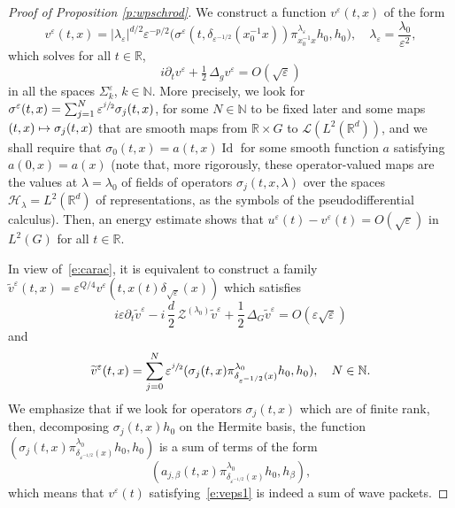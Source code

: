 \documentclass[JEP,XML,SOM,Unicode,published]{cedram}
\let\mathcal\mathscr
\newcommand\mto{\mathchoice{\longmapsto}{\mapsto}{\mapsto}{\mapsto}}
\DeclareMathOperator{\Id}{Id}
\theoremstyle{plain}
\theoremstyle{definition}
\let\eps\varepsilon
\def\R{{\mathbb R}}
\def\N{{\mathbb N}}
\begin{document}
\begin{proof}[Proof of Proposition \ref{p:wpschrod}]
We construct a function $v^\eps(t,x)$
of the form
\begin{equation} \label{e:veps1}
v^\eps(t,x)= |\lambda_\eps|^{d/2} \eps^{-p/2} \bigl(\sigma^\eps(t,\delta_{\eps^{-1/2}}(x_0^{-1} x)) \pi^{\lambda_\eps}_{x_0^{-1} x} h_0,h_0\bigr),\quad \lambda_\eps=\frac{\lambda_0}{\eps^2},
\end{equation}
which
solves for all $t\in\R$,
\begin{equation*}%
i\partial_t v^\eps +\tfrac 12\, \Delta_g v^\eps= O(\sqrt\eps)
\end{equation*}
in all the spaces $\Sigma^\eps_k$, $k\in\N$.
More precisely, we look for $\sigma^\eps(t,x) =\sum_{j=1}^N\eps^{\sfrac{j}{2}}\sigma_j(t,x)$, for some $N\in\N$ to be fixed later and
some maps $(t,x)\mto \sigma_j(t,x) $ that are smooth maps from $\R\times G$ to $\mathcal L(L^2(\R^d))$, and we shall require that $\sigma_0(t,x)=a(t,x)\Id$ for some smooth function $a$ satisfying $a(0,x)=a(x)$
(note that, more rigorously, these operator-valued maps are the values at $\lambda=\lambda_0$ of fields of operators $\sigma_j(t,x,\lambda)$ over the spaces $\mathcal H_\lambda = L^2(\R^d)$ of representations, as the symbols of the pseudodifferential calculus).
Then, an energy estimate shows that $u^\eps(t)-v^\eps(t) =O(\sqrt\eps)$ in $L^2(G)$ for all $t\in \R$.

In view of~\eqref{e:carac}, it is equivalent to construct a family
$\widetilde v^\eps(t,x)\!=\!\eps^{Q/4} v^\eps(t,x(t) \delta_{\sqrt\eps}(x))$
which satisfies
\[
i\eps \partial_t \widetilde v^\eps -i\,\frac{d}{2}\, \mathcal Z^{(\lambda_0)} \widetilde v^\eps +\frac 12\, \Delta_G \widetilde v^\eps= O(\eps \sqrt\eps)
\]
and
\begin{equation*}%
\widetilde v^\eps (t,x)= \sum_{j=0}^N \eps^{\sfrac{j}{2}}
(\sigma_j(t,x)\pi^{\lambda_0}_{\delta_{\eps^{-1/2}}(x)}h_0,h_0), \quad N\in\N.
\end{equation*}
We emphasize that if we look for operators $\sigma_j(t,x)$ which are of finite rank, then, decomposing $\sigma_j(t,x) h_0$ on the Hermite basis, the function $(\sigma_j(t,x)\pi^{\lambda_0}_{\delta_{\eps^{-1/2}}(x)}h_0,h_0)$ is a sum of terms of the form
\[
(a_{j,\beta}(t,x)\pi^{\lambda_0}_{\delta_{\eps^{-1/2}}(x)}h_0,h_\beta),
\]
which means that $v^\eps(t)$ satisfying~\eqref{e:veps1} is indeed a sum of wave packets.


\end{proof}
\end{document}
